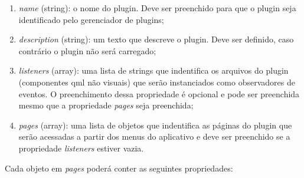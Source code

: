 \begin{enumerate}
	\item \textit{name} (string): o nome do plugin. Deve ser preenchido para que o plugin seja identificado pelo gerenciador de plugins;

	\item \textit{description} (string): um texto que descreve o plugin. Deve ser definido, caso contrário o plugin não será carregado;

	\item \textit{listeners} (array): uma lista de strings que indentifica os arquivos do plugin (componentes qml não visuais) que serão instanciados como observadores de eventos. O preenchimento dessa propriedade é opcional e pode ser preenchida mesmo que a propriedade \textit{pages} seja preenchida;

	\item \textit{pages} (array): uma lista de objetos que indentifica as páginas do plugin que serão acessadas a partir dos menus do aplicativo e deve ser preenchido se a propriedade \textit{listeners} estiver vazia.
\end{enumerate}

Cada objeto em \textit{pages} poderá conter as seguintes propriedades:

